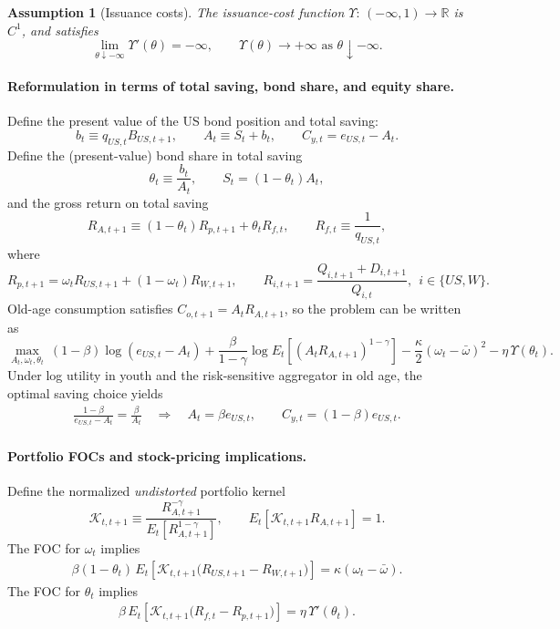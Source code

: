 \documentclass[12pt]{article}
\theoremstyle{plain}
\newtheorem{ass}{Assumption}
\begin{document}
\begin{ass}[Issuance costs]\label{ass_issuance_costs}
The issuance-cost function $\Upsilon:\,(-\infty,1)\to\mathbb R$ is $C^1$, and satisfies
\[
\lim_{\theta\downarrow -\infty}\Upsilon'(\theta)=-\infty,
\qquad
\Upsilon(\theta)\to+\infty \text{ as } \theta\downarrow -\infty.
\]
\end{ass}

\paragraph{Reformulation in terms of total saving, bond share, and equity share.}
Define the present value of the US bond position and total saving:
\[
b_t\equiv q_{US,t}B_{US,t+1},
\qquad
A_t \equiv S_t+b_t,
\qquad
C_{y,t}=e_{US,t}-A_t.
\]
Define the (present-value) bond share in total saving
\[
\theta_t \equiv \frac{b_t}{A_t},
\qquad
S_t=(1-\theta_t)A_t,
\]
and the gross return on total saving
\[
R_{A,t+1}\equiv (1-\theta_t)R_{p,t+1}+\theta_t R_{f,t},
\qquad
R_{f,t}\equiv \frac{1}{q_{US,t}},
\]
where
\[
R_{p,t+1}=\omega_t R_{US,t+1}+(1-\omega_t)R_{W,t+1},
\qquad
R_{i,t+1}=\frac{Q_{i,t+1}+D_{i,t+1}}{Q_{i,t}},
\ \ i\in\{US,W\}.
\]
Old-age consumption satisfies $C_{o,t+1}=A_tR_{A,t+1}$, so the problem can be written as
\[
\max_{A_t,\omega_t,\theta_t}
\ (1-\beta)\log(e_{US,t}-A_t)
+\frac{\beta}{1-\gamma}\log E_t\!\left[(A_tR_{A,t+1})^{1-\gamma}\right]
-\frac{\kappa}{2}(\omega_t-\bar\omega)^2
-\eta\,\Upsilon(\theta_t).
\]
Under log utility in youth and the risk-sensitive aggregator in old age, the optimal saving choice yields
\begin{align}\label{US_saving_rule_bond_cost}
\frac{1-\beta}{e_{US,t}-A_t}=\frac{\beta}{A_t}
\quad\Rightarrow\quad
A_t=\beta e_{US,t},
\qquad
C_{y,t}=(1-\beta)e_{US,t}.
\end{align}

\paragraph{Portfolio FOCs and stock-pricing implications.}
Define the normalized \emph{undistorted} portfolio kernel
\begin{equation}\label{US_K_def}
\mathcal K_{t,t+1}
\equiv
\frac{R_{A,t+1}^{-\gamma}}{E_t\!\left[R_{A,t+1}^{1-\gamma}\right]},
\qquad
E_t\!\left[\mathcal K_{t,t+1}R_{A,t+1}\right]=1.
\end{equation}
The FOC for $\omega_t$ implies
\begin{align}\label{US_omega_FOC_bond_cost}
\beta(1-\theta_t)\,
E_t\!\left[\mathcal K_{t,t+1}\bigl(R_{US,t+1}-R_{W,t+1}\bigr)\right]
=
\kappa(\omega_t-\bar\omega).
\end{align}
The FOC for $\theta_t$ implies
\begin{align}\label{US_theta_FOC_bond_cost}
\beta\,
E_t\!\left[\mathcal K_{t,t+1}\bigl(R_{f,t}-R_{p,t+1}\bigr)\right]
=
\eta\,\Upsilon'(\theta_t).
\end{align}
\end{document}
